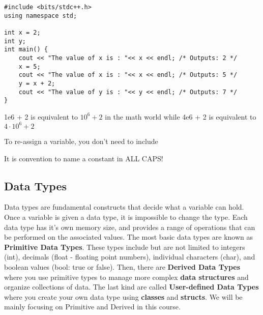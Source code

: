 \documentclass{report}
\begin{document}
\begin{lstlisting}[caption=Variables]
#include <bits/stdc++.h>
using namespace std;

int x = 2;
int y;
int main() {
    cout << "The value of x is : "<< x << endl; /* Outputs: 2 */
    x = 5;
    cout << "The value of x is : "<< x << endl; /* Outputs: 5 */
    y = x + 2;
    cout << "The value of y is : "<< y << endl; /* Outputs: 7 */
}
\end{lstlisting}

\begin{note}
    1e6 + 2 is equivalent to $10^6 + 2$ in the math world while 4e6 + 2 is equivalent to $4 \cdot 10^6 + 2$
\end{note}

\begin{principle}
    To re-assign a variable, you don't need to include 
\end{principle}

\begin{principle}
    It is convention to name a constant in ALL CAPS!
\end{principle}

\subsection{Data Types}
Data types are fundamental constructs that decide what a variable can hold. Once a variable is given a data type, it is impossible to change the type. Each data type has it's own memory size, and provides a range of operations that can be performed on the associated values. The most basic data types are known as \textbf{Primitive Data Types}. These types include but are not limited to integers (int), decimals (float - floating point numbers), individual characters (char), and boolean values (bool: true or false). Then, there are \textbf{Derived Data Types} where you use primitive types to manage more complex \textbf{data structures} and organize collections of data. The last kind are called \textbf{User-defined Data Types} where you create your own data type using \textbf{classes} and \textbf{structs}. We will be mainly focusing on Primitive and Derived in this course.
\end{document}
